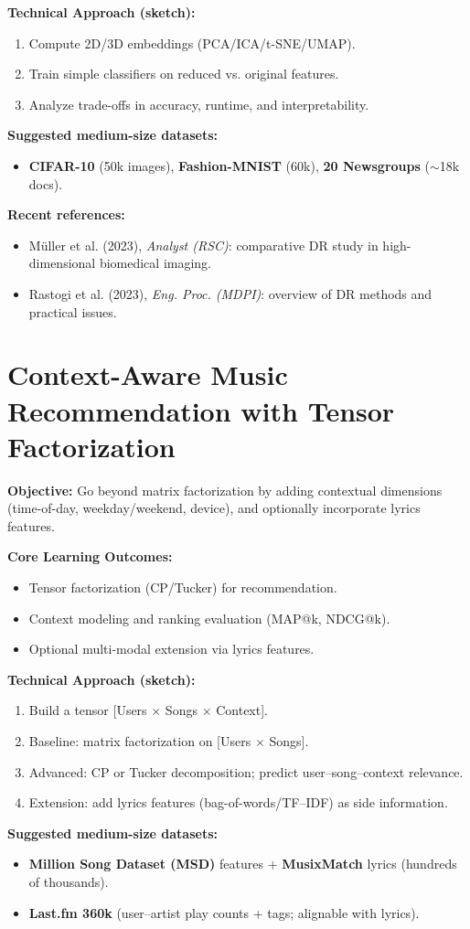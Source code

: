 \documentclass[11pt]{article}
\begin{document}
\textbf{Technical Approach (sketch):}
\begin{enumerate}[leftmargin=2em]
  \item Compute 2D/3D embeddings (PCA/ICA/t-SNE/UMAP).
  \item Train simple classifiers on reduced vs. original features.
  \item Analyze trade-offs in accuracy, runtime, and interpretability.
\end{enumerate}

\textbf{Suggested medium-size datasets:}
\begin{itemize}[leftmargin=2em]
  \item \textbf{CIFAR-10} (50k images), \textbf{Fashion-MNIST} (60k), \textbf{20 Newsgroups} (\(\sim\)18k docs).
\end{itemize}

\textbf{Recent references:}
\begin{itemize}[leftmargin=2em]
  \item Müller et al. (2023), \textit{Analyst (RSC)}: comparative DR study in high-dimensional biomedical imaging.
  \item Rastogi et al. (2023), \textit{Eng. Proc. (MDPI)}: overview of DR methods and practical issues.
\end{itemize}

\section{Context-Aware Music Recommendation with Tensor Factorization}
\textbf{Objective:} Go beyond matrix factorization by adding contextual dimensions (time-of-day, weekday/weekend, device), and optionally incorporate lyrics features.

\textbf{Core Learning Outcomes:}
\begin{itemize}[leftmargin=2em]
  \item Tensor factorization (CP/Tucker) for recommendation.
  \item Context modeling and ranking evaluation (MAP@k, NDCG@k).
  \item Optional multi-modal extension via lyrics features.
\end{itemize}

\textbf{Technical Approach (sketch):}
\begin{enumerate}[leftmargin=2em]
  \item Build a tensor [Users \(\times\) Songs \(\times\) Context].
  \item Baseline: matrix factorization on [Users \(\times\) Songs].
  \item Advanced: CP or Tucker decomposition; predict user--song--context relevance.
  \item Extension: add lyrics features (bag-of-words/TF--IDF) as side information.
\end{enumerate}

\textbf{Suggested medium-size datasets:}
\begin{itemize}[leftmargin=2em]
  \item \textbf{Million Song Dataset (MSD)} features + \textbf{MusixMatch} lyrics (hundreds of thousands).
  \item \textbf{Last.fm 360k} (user--artist play counts + tags; alignable with lyrics).
\end{itemize}
\end{document}
